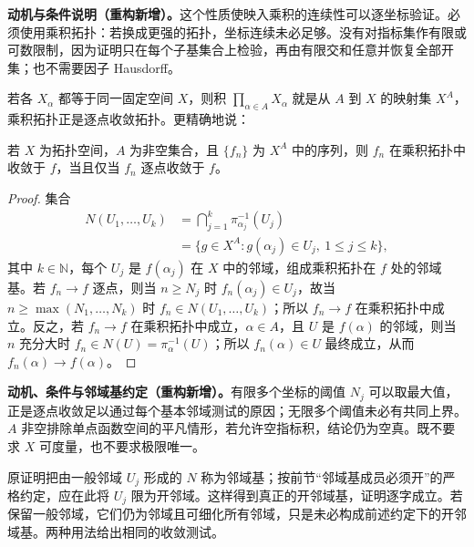 \documentclass[../../main.tex]{subfiles}%
\begin{document}
\begin{remark}
\textbf{动机与条件说明（重构新增）。}这个性质使映入乘积的连续性可以逐坐标验证。必须使用乘积拓扑：若换成更强的拓扑，坐标连续未必足够。没有对指标集作有限或可数限制，因为证明只在每个子基集合上检验，再由有限交和任意并恢复全部开集；也不需要因子 Hausdorff。
\end{remark}
若各 $X_\alpha$ 都等于同一固定空间 $X$，则积 $\prod_{\alpha\in A}X_\alpha$ 就是从 $A$ 到 $X$ 的映射集 $X^A$，乘积拓扑正是逐点收敛拓扑。更精确地说：
\begin{proposition}\label{proposition:ch04-product-pointwise-convergence}
若 $X$ 为拓扑空间，$A$ 为非空集合，且 $\{f_n\}$ 为 $X^A$ 中的序列，则 $f_n$ 在乘积拓扑中收敛于 $f$，当且仅当 $f_n$ 逐点收敛于 $f$。
\end{proposition}
\begin{proof}
集合
\begin{align*}
N(U_1,\ldots,U_k)
&=\bigcap_{j=1}^k\pi_{\alpha_j}^{-1}(U_j)\\
&=\{g\in X^A:g(\alpha_j)\in U_j,\ 1\le j\le k\},
\end{align*}
其中 $k\in\mathbb N$，每个 $U_j$ 是 $f(\alpha_j)$ 在 $X$ 中的邻域，组成乘积拓扑在 $f$ 处的邻域基。若 $f_n\to f$ 逐点，则当 $n\ge N_j$ 时 $f_n(\alpha_j)\in U_j$，故当 $n\ge\max(N_1,\ldots,N_k)$ 时 $f_n\in N(U_1,\ldots,U_k)$；所以 $f_n\to f$ 在乘积拓扑中成立。反之，若 $f_n\to f$ 在乘积拓扑中成立，$\alpha\in A$，且 $U$ 是 $f(\alpha)$ 的邻域，则当 $n$ 充分大时 $f_n\in N(U)=\pi_\alpha^{-1}(U)$；所以 $f_n(\alpha)\in U$ 最终成立，从而 $f_n(\alpha)\to f(\alpha)$。
\end{proof}
\begin{remark}
\textbf{动机、条件与邻域基约定（重构新增）。}有限多个坐标的阈值 $N_j$ 可以取最大值，正是逐点收敛足以通过每个基本邻域测试的原因；无限多个阈值未必有共同上界。$A$ 非空排除单点函数空间的平凡情形，若允许空指标积，结论仍为空真。既不要求 $X$ 可度量，也不要求极限唯一。

原证明把由一般邻域 $U_j$ 形成的 $N$ 称为邻域基；按前节“邻域基成员必须开”的严格约定，应在此将 $U_j$ 限为开邻域。这样得到真正的开邻域基，证明逐字成立。若保留一般邻域，它们仍为邻域且可细化所有邻域，只是未必构成前述约定下的开邻域基。两种用法给出相同的收敛测试。
\end{remark}
\end{document}
